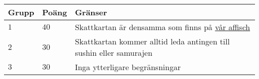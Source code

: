 \noindent
\begin{tabular}{| l | l | p{12cm} |}
  \hline
  \textbf{Grupp} & \textbf{Poäng} & \textbf{Gränser} \\ \hline
  $1$    & $40$      & Skattkartan är densamma som finns på \href{https://www.progolymp.se/2018/affisch.pdf}{vår affisch} \\ \hline
  $2$    & $30$      & Skattkartan kommer alltid leda antingen till sushin eller samurajen \\ \hline
  $3$    & $30$      & Inga ytterligare begränsningar  \\ \hline
\end{tabular}
